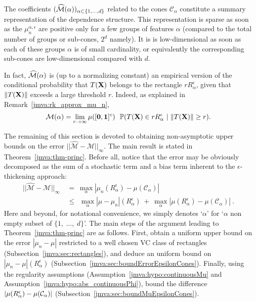 The coefficients $(\widehat{\mathcal{M}}(\alpha))_{\alpha\subset\{1,\ldots,d\}}$ related to the cones $\mathcal{C}_\alpha$ constitute a summary representation of the dependence structure.  %
This representation is sparse as soon as the $\mu_n^{\alpha,  \epsilon}$ are positive only for a few groups of features $\alpha$ (compared to the total number of groups or sub-cones, $2^d$ namely). It is  is low-dimensional as soon as each of these groups $\alpha$ is of small cardinality, or equivalently the corresponding sub-cones are low-dimensional compared with $d$.

In fact, $\widehat{\mathcal{M}}(\alpha)$ is (up to a normalizing constant) an empirical version of the  conditional probability that $T(\mathbf X)$ belongs to the rectangle $ r R_\alpha^\epsilon$, given that $\|T(\mathbf X)\|$ exceeds  a large threshold $r$. Indeed, as explained in Remark~\ref{jmva:rk_approx_mu_n},  
\begin{align}\label{jmva:eq:interprete_mun_Pcondit}
\mathcal{M}(\alpha) = \lim_{r \to \infty} \mu([\mathbf 0,\mathbf{1}]^c)~~\mathbb{P}(T(\mathbf X)\in r R_\alpha^\epsilon ~|~ \|T(\mathbf X)\|\ge r) . 
\end{align}

The remaining of this section is devoted to obtaining non-asymptotic upper bounds on the error $\vert\vert \widehat{\mathcal{M}}-\mathcal{M}\vert\vert_{\infty}$. 
The main result is stated in Theorem~\ref{jmva:thm-princ}. 
Before all, notice that the error may be obviously decomposed as the sum of a stochastic term and a bias term inherent to the $\epsilon$-thickening approach:
\begin{align}
\vert\vert \widehat{\mathcal{M}}-\mathcal{M}\vert\vert_{\infty} &~=~\max_{\alpha} |
\mu_n(R_\alpha^\epsilon)-\mu(\mathcal{C}_\alpha)|\nonumber
\\&~\le~ ~\max_\alpha |\mu-\mu_n|(R_\alpha^\epsilon) ~+~ \max_\alpha|\mu(R_\alpha^\epsilon)-\mu(\mathcal{C}_\alpha)|~.\label{jmva:error_decomp} 
\end{align}
Here and beyond, for notational convenience, we simply denotes `$\alpha$'  for `$\alpha$ non empty subset of $\{1,\; \ldots,\;d\}$'. The main steps of the argument leading to Theorem~\ref{jmva:thm-princ} are  as follows. First, obtain a uniform upper bound on the error $|\mu_n - \mu|$ restricted to a well chosen VC class of rectangles (Subsection~\ref{jmva:sec:rectangles}), and deduce an uniform bound on  $|\mu_n - \mu|(R_\alpha^\epsilon)$ (Subsection~\ref{jmva:sec:boundErrorEpsilonCones}). Finally, using the regularity assumptions (Assumption~\ref{jmva:hypo:continuousMu} and Assumption~\ref{jmva:hypo:abs_continuousPhi}), bound the difference $|\mu(R_\alpha^\epsilon) - \mu(\mathcal{C}_\alpha)|$ (Subsection~\ref{jmva:sec:boundMuEpsilonCones}). 


